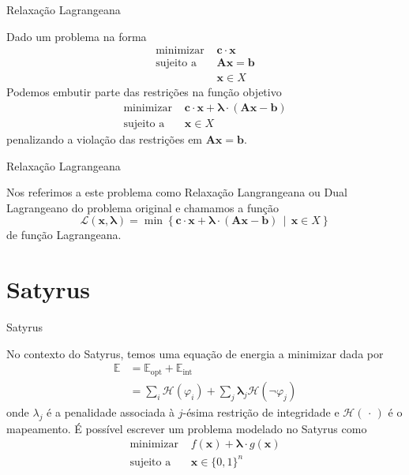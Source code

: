 \documentclass[brazil, MathSerif, aspectratio = 169]{beamer}
\begin{document}
\begin{frame}{Relaxação Lagrangeana}
    \begin{definition}
        Dado um problema na forma
        \begin{align*}
            \text{minimizar } &\mathbf{c} \cdot \mathbf{x}\\
            \text{sujeito a } & \mathbf{A} \mathbf{x} = \mathbf{b}\\
                &\mathbf{x} \in X
        \end{align*}
        Podemos embutir parte das restrições na função objetivo 
        \begin{align*}
            \text{minimizar } &\mathbf{c} \cdot \mathbf{x} + \pmb{\lambda} \cdot \left( \mathbf{A} \mathbf{x} - \mathbf{b} \right)\\
            \text{sujeito a } &\mathbf{x} \in X
        \end{align*}
        penalizando a violação das restrições em $\mathbf{A} \mathbf{x} = \mathbf{b}$.
    \end{definition}
\end{frame}

\begin{frame}{Relaxação Lagrangeana}
    \begin{definition}
        Nos referimos a este problema como Relaxação Langrangeana ou Dual Lagrangeano do problema original e chamamos a função
            $$\mathcal{L}(\mathbf{x}, \pmb{\lambda}) = \min \left\{%
                \mathbf{c} \cdot \mathbf{x} + \pmb{\lambda} \cdot \left(%
                \mathbf{A} \mathbf{x} - \mathbf{b}
                \right)\, \middle|\, \mathbf{x} \in X
            \right\}$$
        de função Lagrangeana.
    \end{definition}
\end{frame}

\section{Satyrus}

\begin{frame}{Satyrus}

    No contexto do Satyrus, temos uma equação de energia a minimizar dada por
        \begin{align*}
            \mathbb{E} &= \mathbb{E}_\text{opt} + \mathbb{E}_\text{int}\\
                       &= \sum_{i} \mathcal{H} \left( \varphi_i \right) %
                       + \sum_j \pmb{\lambda}_j \mathcal{H} \left( \neg \varphi_j \right)
        \end{align*}
    onde $\lambda_j$ é a penalidade associada à $j$-ésima restrição de integridade e $\mathcal{H} \left(\,\cdot\,\right)$ é o mapeamento. É possível escrever um problema modelado no Satyrus como
        \begin{align*}
            \text{minimizar } &f(\mathbf{x}) + \pmb{\lambda} \cdot g(\mathbf{x})\\
            \text{sujeito a } &\mathbf{x} \in \{0, 1\}^{n}
        \end{align*}
\end{frame}
\end{document}
